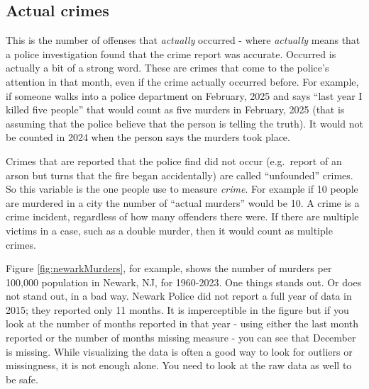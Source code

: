 \documentclass[
]{krantz}
\begin{document}
\subsection{Actual crimes}\label{actual}

This is the number of offenses that \emph{actually} occurred
- where \emph{actually} means that a police investigation
found that the crime report was accurate. Occurred is
actually a bit of a strong word. These are crimes that come
to the police's attention in that month, even if the crime
actually occurred before. For example, if someone walks into
a police department on February, 2025 and says ``last year I
killed five people'' that would count as five murders in
February, 2025 (that is assuming that the police believe
that the person is telling the truth). It would not be
counted in 2024 when the person says the murders took place.

Crimes that are reported that the police find did not occur
(e.g.~report of an arson but turns that the fire began
accidentally) are called ``unfounded'' crimes. So this
variable is the one people use to measure \emph{crime}. For
example if 10 people are murdered in a city the number of
``actual murders'' would be 10. A crime is a crime incident,
regardless of how many offenders there were. If there are
multiple victims in a case, such as a double murder, then it
would count as multiple crimes.

Figure \ref{fig:newarkMurders}, for example, shows the
number of murders per 100,000 population in Newark, NJ, for
1960-2023. One things stands out. Or does not stand out, in
a bad way. Newark Police did not report a full year of data
in 2015; they reported only 11 months. It is imperceptible
in the figure but if you look at the number of months
reported in that year - using either the last month reported
or the number of months missing measure - you can see that
December is missing. While visualizing the data is often a
good way to look for outliers or missingness, it is not
enough alone. You need to look at the raw data as well to be
safe.
\end{document}
